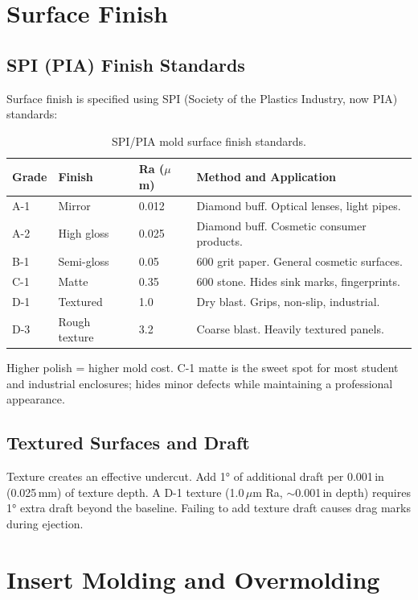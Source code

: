 \section{Surface Finish}
\subsection{SPI (PIA) Finish Standards}
Surface finish is specified using SPI (Society of the Plastics Industry, now PIA) standards:

\begin{table}[htbp]\centering\small
\begin{tabularx}{\textwidth}{l l l X}
\toprule
\textbf{Grade} & \textbf{Finish} & \textbf{Ra ($\mu$m)} & \textbf{Method and Application} \\
\midrule
A-1 & Mirror & 0.012 & Diamond buff. Optical lenses, light pipes. \\
A-2 & High gloss & 0.025 & Diamond buff. Cosmetic consumer products. \\
B-1 & Semi-gloss & 0.05 & 600 grit paper. General cosmetic surfaces. \\
C-1 & Matte & 0.35 & 600 stone. Hides sink marks, fingerprints. \\
D-1 & Textured & 1.0 & Dry blast. Grips, non-slip, industrial. \\
D-3 & Rough texture & 3.2 & Coarse blast. Heavily textured panels. \\
\bottomrule
\end{tabularx}
\caption{SPI/PIA mold surface finish standards.}
\end{table}

Higher polish = higher mold cost. C-1 matte is the sweet spot for most student and industrial enclosures; hides minor defects while maintaining a professional appearance.

\subsection{Textured Surfaces and Draft}
Texture creates an effective undercut. Add \ang{1} of additional draft per 0.001\,in (0.025\,mm) of texture depth. A D-1 texture (1.0\,$\mu$m Ra, $\sim$0.001\,in depth) requires \ang{1} extra draft beyond the baseline. Failing to add texture draft causes drag marks during ejection.

\section{Insert Molding and Overmolding}

